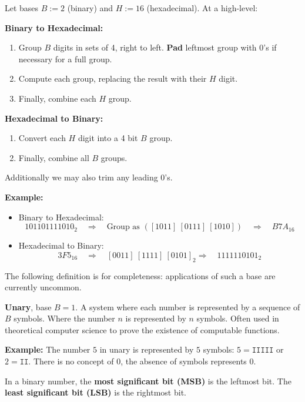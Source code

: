 \begin{theo}

    Let bases \( B:=2 \) (binary) and \( H:=16 \) (hexadecimal). At a high-level:

    \vspace{.5em}
    
    \noindent \textbf{Binary to Hexadecimal:}
    \begin{enumerate}
        \item Group $B$ digits in sets of 4, right to left. \textbf{Pad} leftmost group with 0's if necessary for a full group.
        \item Compute each group, replacing the result with their $H$ digit.
        \item Finally, combine each $H$ group.
    \end{enumerate}
    
    \noindent \textbf{Hexadecimal to Binary:}
    \begin{enumerate}
        \item Convert each $H$ digit into a 4 bit $B$ group.
        \item Finally, combine all $B$ groups.
    \end{enumerate}
    \noindent
    Additionally we may also trim any leading 0's.
\end{theo}

\newpage

\noindent
\textbf{Example:}
    \begin{itemize}
        \item Binary to Hexadecimal:
        \[
        101101111010_2 \quad \Rightarrow \quad \text{Group as } ([1011] \ [0111] \ [1010]) \quad \Rightarrow \quad B7A_{16}
        \]
        \item Hexadecimal to Binary:
        \[
        3F5_{16} \quad \Rightarrow \quad [0011]\ [1111]\ [0101]_2 \Rightarrow \quad 1111110101_2
        \]
        \noindent
    \end{itemize}
    \noindent
The following definition is for completeness: applications of such a base are currently uncommon.
\begin{Def}[Unary]
    
    \textbf{Unary}, base $B=1$. A system where each number is represented by a sequence of $B$ symbols. Where the number $n$ is represented by $n$ symbols. Often used in theoretical computer science to prove the existence of computable functions.
\end{Def}
\noindent
\textbf{Example:} The number $5$ in unary is represented by $5$ symbols: $5 = \texttt{IIIII}$ or $2= \texttt{II}$. There is no concept of 0, the absence of symbols represents 0.\\
\begin{Def}
    
    In a binary number, the \textbf{most significant bit (MSB)} is the leftmost bit. The \textbf{least significant bit (LSB)} is the rightmost bit.
\end{Def}

